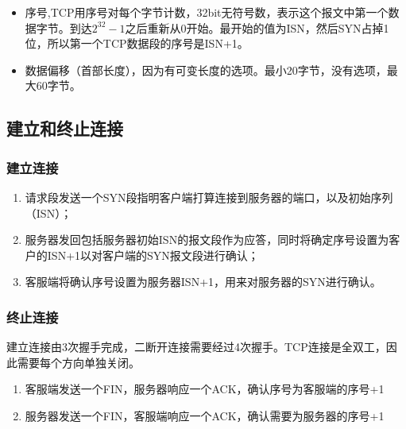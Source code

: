\begin{itemize}
\item 序号,TCP用序号对每个字节计数，32bit无符号数，表示这个报文中第一个数据字节。到达$2^{32} - 1$之后重新从0开始。最开始的值为ISN，然后SYN占掉1位，所以第一个TCP数据段的序号是ISN+1。

\item 数据偏移（首部长度），因为有可变长度的选项。最小20字节，没有选项，最大60字节。

\end{itemize}

\subsection{建立和终止连接}

\subsubsection{建立连接}

\begin{enumerate}
\item 请求段发送一个SYN段指明客户端打算连接到服务器的端口，以及初始序列（ISN）；

\item 服务器发回包括服务器初始ISN的报文段作为应答，同时将确定序号设置为客户的ISN+1以对客户端的SYN报文段进行确认；

\item 客服端将确认序号设置为服务器ISN+1，用来对服务器的SYN进行确认。

\end{enumerate}

\subsubsection{终止连接}

建立连接由3次握手完成，二断开连接需要经过4次握手。TCP连接是全双工，因此需要每个方向单独关闭。

\begin{enumerate}
\item 客服端发送一个FIN，服务器响应一个ACK，确认序号为客服端的序号+1

\item 服务器发送一个FIN，客服端响应一个ACK，确认需要为服务器的序号+1
\end{enumerate}

